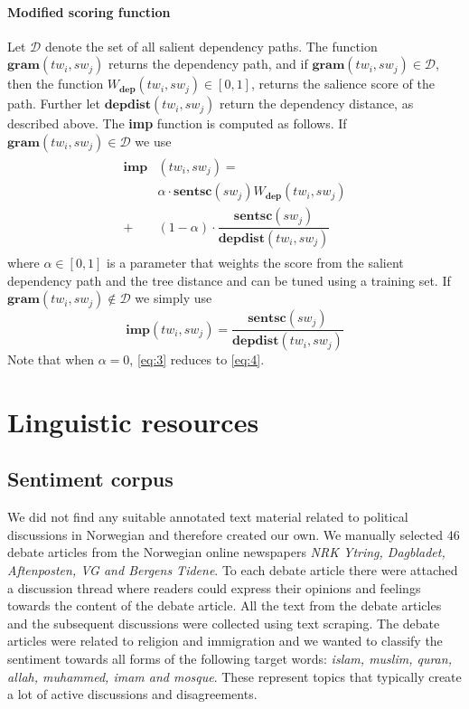 \documentclass[11pt]{article}
\begin{document}
\paragraph{Modified scoring function}
Let $\mathcal{D}$ denote the set of all salient dependency paths. The function $\mathbf{gram}(tw_i, sw_{j})$ returns the dependency path, and if $\mathbf{gram}(tw_i, sw_{j}) \in \mathcal{D}$, then the function $W_{\mathbf{dep}}(tw_i, sw_{j}) \in [0,1]$, returns the salience score of the path. Further let $\mathbf{depdist}(tw_i, sw_{j})$ return the dependency distance, as described above. The \textbf{imp} function is computed as follows. If $\mathbf{gram}(tw_i, sw_{j}) \in \mathcal{D}$ we use
\begin{align}
  \begin{split}
    \label{eq:3}
  \mathbf{imp}&(tw_i, sw_{j}) = \\
  &\alpha \cdot \mathbf{sentsc}(sw_{j}) W_{\mathbf{dep}}(tw_i, sw_{j}) \\
  +&(1 - \alpha) \cdot \dfrac{\mathbf{sentsc}(sw_{j})}{\mathbf{depdist}(tw_i, sw_{j})}    
  \end{split}
\end{align}
where $\alpha \in [0,1]$ is a parameter that weights the score from the salient dependency path and the tree distance and can be tuned using a training set. If $\mathbf{gram}(tw_i, sw_{j}) \not\in \mathcal{D}$ we simply use 
\begin{equation}
  \label{eq:4}
  \mathbf{imp}(tw_i, sw_{j}) = \dfrac{\mathbf{sentsc}(sw_{j})}{\mathbf{depdist}(tw_i, sw_{j})}    
\end{equation}
Note that when $\alpha = 0$, \eqref{eq:3} reduces to \eqref{eq:4}.


\section{Linguistic resources}
\label{sec:results}

\subsection{Sentiment corpus}

We did not find any suitable annotated text material related to political discussions in Norwegian and therefore created our own. We manually selected 46 debate articles from the Norwegian online newspapers \textit{NRK Ytring, Dagbladet, Aftenposten, VG and Bergens Tidene}. To each debate article there were attached a discussion thread where readers could express their opinions and feelings towards the content of the debate article. All the text from the debate articles and the subsequent discussions were collected using text scraping. The debate articles were related to religion and immigration and we wanted to classify the sentiment towards all forms of the following target words: \textit{islam, muslim, quran, allah, muhammed, imam and mosque}. These represent topics that typically create a lot of active discussions and disagreements.
\end{document}
